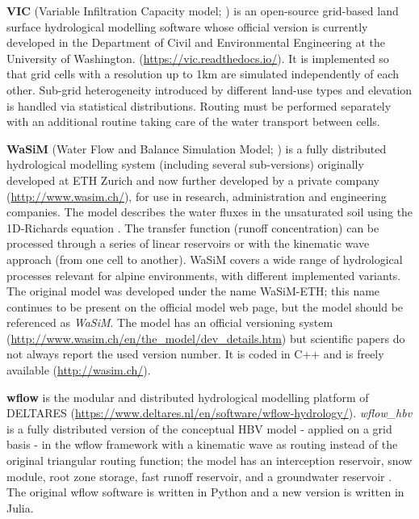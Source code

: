 \documentclass[10pt,a4paper]{article}
\begin{document}
\textbf{VIC} (Variable Infiltration Capacity model; \citealp{Liang1994a}) is an open-source grid-based land surface hydrological modelling software whose official version is currently developed in the Department of Civil and Environmental Engineering at the University of Washington. (\url{https://vic.readthedocs.io/}). It is implemented so that grid cells with a resolution up to 1km are simulated independently of each other. Sub-grid heterogeneity introduced by different land-use types and elevation is handled via statistical distributions. Routing must be performed separately with an additional routine taking care of the water transport between cells.

\textbf{WaSiM} (Water Flow and Balance Simulation Model; \citealp{Schulla2007, Schulla2009}) is a fully distributed hydrological modelling system (including several sub-versions) originally developed at ETH Zurich and now further developed by a private company (\url{http://www.wasim.ch/}), for use in research, administration and engineering companies. The model describes the water fluxes in the unsaturated soil using the 1D-Richards equation \citep{Richards1931}. The transfer function (runoff concentration) can be processed through a series of linear reservoirs or with the kinematic wave approach (from one cell to another). WaSiM covers a wide range of hydrological processes relevant for alpine environments, with different implemented variants. The original model was developed under the name WaSiM-ETH; this name continues to be present on the official model web page, but the model should be referenced as \textit{WaSiM}. The model has an official versioning system (\url{http://www.wasim.ch/en/the\_model/dev\_details.htm}) but scientific papers do not always report the used version number. It is coded in C++ and is freely available (\url{http://wasim.ch/}).

\textbf{wflow} is the modular and distributed hydrological modelling platform of DELTARES (\url{https://www.deltares.nl/en/software/wflow-hydrology/}). \textit{wflow\_hbv} is a fully distributed version of the conceptual HBV model \citep{Lindstrm1997} - applied on a grid basis - in the wflow framework with a kinematic wave as routing instead of the original triangular routing function; the model has an interception reservoir, snow module, root zone storage, fast runoff reservoir, and a groundwater reservoir \citep{deBoerEuser2017}. The original wflow software is written in Python and a new version is written in Julia. 




\end{document}

